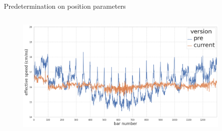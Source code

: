 \documentclass{ikpKoeln}
\begin{document}
\begin{frame}[t]{Predetermination on position parameters}
\begin{columns}[t]
\begin{column}[t]{0.48\textwidth}
{\begin{figure}[t]
					\includegraphics[width = 0.95\textwidth]{R3BCon2024GSI/effective_c.png}
				\end{figure}
			}
		\end{column}
	\end{columns}
\end{frame}
\end{document}
